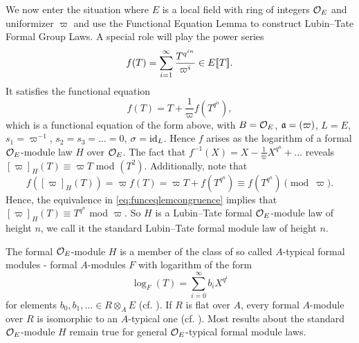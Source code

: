 \documentclass[../main.tex]{subfiles}
\begin{document}
We now enter the situation where $E$ is a local field with ring of integers
$\mathcal{O}_E$ and uniformizer $\varpi$ and 
use the Functional Equation Lemma to construct Lubin--Tate Formal Group Laws. 
A special role will play the power series
\begin{equation*}
  f(T) = \sum_{i=1}^\infty \frac{T^{q^{in}}}{\varpi^i} \in E\llbracket T \rrbracket.
\end{equation*}
It satisfies the functional equation
\begin{equation*}
  f(T) = T + \frac 1\varpi f(T^{q^n}),
\end{equation*}
which is a functional equation of the form above, with 
$B = \mathcal{O}_E$, $\mathfrak{a} = (\varpi)$, $L = E$, $s_1 = \varpi^{-1}$, $s_2 = s_3 = \dots = 0$,
$\sigma = \operatorname{id}_L$. 
Hence $f$ arises as the logarithm of a formal $\mathcal{O}_E$-module law $H$ over $\mathcal{O}_E$.
The fact that $f^{-1}(X) = X - \frac 1\varpi X^{q^n} + \dots$ reveals
$[\varpi]_H(T) \equiv \varpi T$ mod $(T^2)$. Additionally, note that 
\begin{equation*}
  f([\varpi]_H(T)) = \varpi f(T) = \varpi T + f(T^{q^n}) \equiv f(T^{q^n}) \pmod \varpi.
\end{equation*}
Hence, the equivalence in \eqref{eq:funceqlemcongruence} implies that 
$[\varpi]_H(T) \equiv T^{q^n}$ mod $\varpi$. So $H$ is a Lubin--Tate formal $\mathcal{O}_E$-module
law of height $n$, we call it the standard Lubin--Tate formal module law of
height $n$. 
\begin{rmk} 
  The formal $\mathcal{O}_E$-module $H$ is a member of the class of so called $A$-typical
  formal modules - formal $A$-modules $F$ with logarithm of the 
  form
  \begin{equation*}
    \log_F(T) = \sum_{i=0}^\infty b_i X^{q^i}
  \end{equation*}
  for elements $b_0, b_1, \dots \in R \otimes_A E$ (cf. \cite[Definition
  21.5.5 and Criterion 21.5.9]{hazewinkel1978formal}). If $R$ is flat over $A$,
  every formal $A$-module over $R$ is isomorphic to an $A$-typical one
  (cf. \cite[21.5.6]{hazewinkel1978formal}). Most results about the standard
  $\mathcal{O}_E$-module $H$ remain true for general $\mathcal{O}_E$-typical formal module laws.
\end{rmk}
\end{document}
